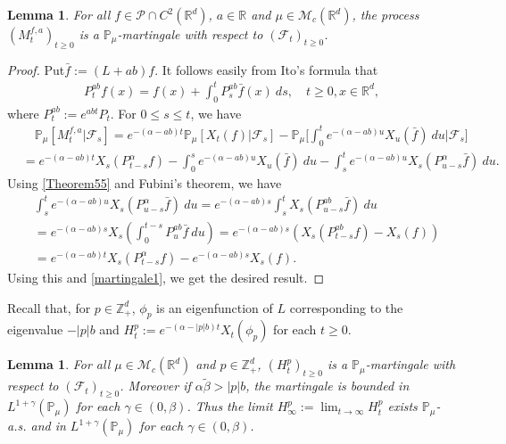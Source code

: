 \documentclass[12pt,a4paper]{amsart}
\theoremstyle{plain}
\newtheorem{lem}[thm]{Lemma}
\theoremstyle{definition}
\numberwithin{equation}{section}
\begin{document}
\begin{lem}
  \label{lemma25}
  For all $f\in \mathcal{P}\cap C^2(\mathbb R^d)$, $a\in \mathbb R$ and $\mu\in \mathcal M_c(\mathbb R^d)$, the process $(M_t^{f,a})_{t\geq 0}$ is a $\mathbb P_\mu$-martingale with respect to $(\mathscr F_t)_{t\geq 0}$.
\end{lem}

\begin{proof}
  Put$\bar{f} :=(L+ab)f$.
  It follows easily from Ito's formula that
  \begin{align}
    \label{Theorem55}
    P_t^{ab}f(x)
    = f(x)+\int_0^t P_s^{ab}\bar{f}(x)~ds,\quad t\geq 0,x\in \mathbb R^d,
  \end{align}
  where $P_t^{ab} := e^{abt}P_t$.
  For $0\leq s\leq t$, we have
  \begin{align}
    \label{martingale1}
    & \quad\mathbb{P}_{\mu}[M_t^{f,a}|\mathscr{F}_s]
    =e^{-(\alpha-ab)t}\mathbb{P}_{\mu}\left[X_t(f)|\mathscr{F}_s\right]-\mathbb{P}_{\mu}\Big[\int_0^t e^{-(\alpha-ab)u}X_u(\bar{f})~ du\Big|\mathscr{F}_s\big] \\
    & =e^{-(\alpha-ab)t} X_s(P_{t-s}^{\alpha}f)-\int_0^s e^{-(\alpha-ab)u} X_u(\bar{f})~ du - \int_s^t e^{-(\alpha-ab)u}X_s(P_{u-s}^{\alpha} \bar{f})~ du.
  \end{align}
  Using \eqref{Theorem55} and Fubini's theorem, we have
  \begin{align}
    & \int_s^t e^{-(\alpha-ab)u}X_s(P_{u-s}^{\alpha} \bar{f})~ du=e^{-(\alpha-ab)s}\int_s^tX_s(P_{u-s}^{ab}\bar{f})~du\\
    & = e^{ - ( \alpha - ab ) s } X_s\left( \int_0^{t-s} P_{u}^{ab} \bar{f}~ du\right)
      = e^{-(\alpha-ab)s}\left(X_s(P_{t-s}^{ab}f) - X_s(f) \right) \\
    & = e^{-(\alpha-ab)t} X_s( P_{t-s}^{\alpha}f) - e^{ - ( \alpha - ab ) s} X_s(f).
  \end{align}
  Using this and \eqref{martingale1}, we get the desired result.
\end{proof}

Recall that, for $p\in \mathbb Z_+^d$,  $\phi_p$ is an eigenfunction of $L$ corresponding to the eigenvalue $-|p|b$ and $ H_t^p :=e^{-(\alpha-|p|b)t}X_t(\phi_p)$ for each $t\geq 0$.

\begin{lem}
  \label{lem:M:L:ML}
   For all $\mu\in \mathcal M_c(\mathbb R^d)$ and $p \in \mathbb Z_+^d$, $(H^p_t)_{t\geq 0}$ is a $\mathbb P_{\mu}$-martingale with respect to $(\mathscr F_t)_{t\geq 0}$.
    Moreover if $\alpha\tilde \beta>|p|b$, the martingale is bounded in $L^{1+\gamma}(\mathbb P_\mu)$ for each $\gamma\in (0, \beta)$.
  Thus the limit $ H_{\infty}^p := \lim_{t\rightarrow \infty}H_t^p $  exists $\mathbb{P}_{\mu}$-a.s. and in $L^{1+\gamma}(\mathbb{P}_{\mu})$ for each $\gamma \in (0,\beta)$.
\end{lem}
\end{document}
